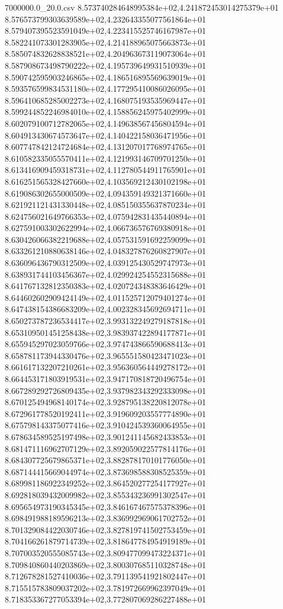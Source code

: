 \begin{filecontents*}{7000000.0_20.0.csv}
8.573740284648995384e+02,4.241872453014275379e+01
8.576573799303639589e+02,4.232643355077561864e+01
8.579407395523591049e+02,4.223415525746167987e+01
8.582241073301283905e+02,4.214188965075663873e+01
8.585074832628838521e+02,4.204963673119073064e+01
8.587908673498790222e+02,4.195739649931510939e+01
8.590742595903246865e+02,4.186516895569639019e+01
8.593576599834531180e+02,4.177295410086026095e+01
8.596410685285002273e+02,4.168075193535969447e+01
8.599244852246984010e+02,4.158856245975402999e+01
8.602079100712782065e+02,4.149638567456804594e+01
8.604913430674573647e+02,4.140422158036471956e+01
8.607747842124724684e+02,4.131207017768974765e+01
8.610582335055570411e+02,4.121993146709701250e+01
8.613416909459318731e+02,4.112780544911765901e+01
8.616251565328427660e+02,4.103569212430102198e+01
8.619086302655000509e+02,4.094359149321371660e+01
8.621921121431330448e+02,4.085150355637870234e+01
8.624756021649766353e+02,4.075942831435440894e+01
8.627591003302622994e+02,4.066736576769380918e+01
8.630426066382219688e+02,4.057531591692259099e+01
8.633261210880638146e+02,4.048327876260827907e+01
8.636096436790312509e+02,4.039125430529747973e+01
8.638931744103456367e+02,4.029924254552315688e+01
8.641767132812350383e+02,4.020724348383646429e+01
8.644602602909424149e+02,4.011525712079401274e+01
8.647438154386683209e+02,4.002328345692694711e+01
8.650273787236534417e+02,3.993132249279187818e+01
8.653109501451258438e+02,3.983937422894177871e+01
8.655945297023059766e+02,3.974743866590688413e+01
8.658781173944330476e+02,3.965551580423471023e+01
8.661617132207210261e+02,3.956360564449278172e+01
8.664453171803919531e+02,3.947170818720496754e+01
8.667289292726809435e+02,3.937982343292333098e+01
8.670125494968140174e+02,3.928795138220812078e+01
8.672961778520192411e+02,3.919609203557774890e+01
8.675798143375077416e+02,3.910424539360064955e+01
8.678634589525197498e+02,3.901241145682433853e+01
8.681471116962707129e+02,3.892059022577814176e+01
8.684307725679865371e+02,3.882878170101776050e+01
8.687144415669044974e+02,3.873698588308525359e+01
8.689981186922349252e+02,3.864520277254177927e+01
8.692818039432009982e+02,3.855343236991302547e+01
8.695654973190345345e+02,3.846167467575378396e+01
8.698491988189596213e+02,3.836992969061702752e+01
8.701329084422030746e+02,3.827819741502753459e+01
8.704166261879714739e+02,3.818647784954919189e+01
8.707003520555085743e+02,3.809477099473224371e+01
8.709840860440203869e+02,3.800307685110328748e+01
8.712678281527410036e+02,3.791139541921802447e+01
8.715515783809037202e+02,3.781972669962397049e+01
8.718353367277053394e+02,3.772807069286227488e+01

\end{filecontents*}
